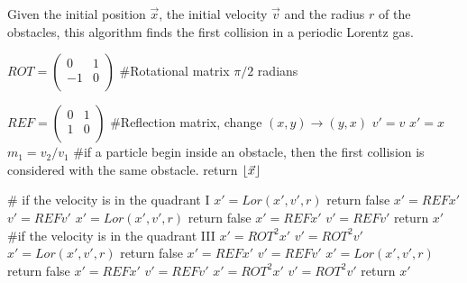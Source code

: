 \documentclass{iopart}
\begin{document}
\begin{algorithm}
\caption{Given the initial position $\vec{x}$, the initial velocity $\vec{v}$ and the radius $r$ of the obstacles, this algorithm finds the first collision in a periodic Lorentz gas.}
\label{alg:Lorentz2D}
\begin{algorithmic} 


$ROT = 
 \begin{pmatrix}
  0 & 1  \\
  -1 & 0  \\
 \end{pmatrix} $
\State  \#Rotational matrix $\pi/2$ radians

$REF = 
 \begin{pmatrix}
  0 & 1  \\
  1 & 0  \\
 \end{pmatrix} $
\State    \#Reflection matrix, change $(x,y) \rightarrow (y,x)$
\State    $v'=v$
\State    $x'=x$
\State    $m_1=v_2/v_1$
\State \#if a particle begin inside an obstacle, then the first collision is considered with the same obstacle. 
\State        return $\floor*{\vec{x}}$
\EndIf

\State \# if the velocity is in the quadrant I 
\State            $x'=Lor(x',v',r)$
\State               return false
            \EndIf
\State            $x'=REF x'$
\State            $v'=REF v'$
\State            $x'=Lor(x',v',r)$
\State                return false
            \EndIf
\State            $x'=REF x'$
\State            $v'=REF v' $           
        \EndIf
\State        return $x'$
\State \#if the velocity is in the quadrant III
\State        $x'=ROT^2 x'$
\State        $v'=ROT^2 v'$
\State            $x'=Lor(x',v',r)$  
\State                return false
            \EndIf
\State            $x'=REF x'$
\State            $v'=REF v'$
\State            $x'=Lor(x',v',r)$
\State                return false
            \EndIf
\State            $x'=REF x'$
\State            $v'=REF v' $  
        \EndIf
\State        $x'=ROT^2 x'$
\State        $v'=ROT^2 v'$
\State        return $x'$

\end{algorithmic}
\end{algorithm}
\end{document}
